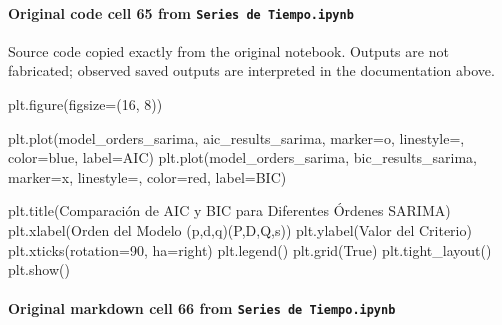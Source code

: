 \documentclass[
  11pt,
]{article}
\newenvironment{Shaded}{}{}
\newcommand{\DecValTok}[1]{\textcolor[rgb]{0.25,0.63,0.44}{#1}}
\newcommand{\NormalTok}[1]{#1}
\newcommand{\OperatorTok}[1]{\textcolor[rgb]{0.40,0.40,0.40}{#1}}
\newcommand{\StringTok}[1]{\textcolor[rgb]{0.25,0.44,0.63}{#1}}
\newcommand{\VariableTok}[1]{\textcolor[rgb]{0.10,0.09,0.49}{#1}}
\begin{document}
\paragraph{\texorpdfstring{Original code cell 65 from \texttt{Series\ de\ Tiempo.ipynb}}{Original code cell 65 from Series de Tiempo.ipynb}}\label{original-code-cell-65-from-series-de-tiempoipynb}

Source code copied exactly from the original notebook. Outputs are not fabricated; observed saved outputs are interpreted in the documentation above.

\begin{Shaded}
\begin{Highlighting}[]
\NormalTok{plt.figure(figsize}\OperatorTok{=}\NormalTok{(}\DecValTok{16}\NormalTok{, }\DecValTok{8}\NormalTok{))}

\NormalTok{plt.plot(model\_orders\_sarima, aic\_results\_sarima, marker}\OperatorTok{=}\StringTok{\textquotesingle{}o\textquotesingle{}}\NormalTok{, linestyle}\OperatorTok{=}\StringTok{\textquotesingle{}{-}\textquotesingle{}}\NormalTok{, color}\OperatorTok{=}\StringTok{\textquotesingle{}blue\textquotesingle{}}\NormalTok{, label}\OperatorTok{=}\StringTok{\textquotesingle{}AIC\textquotesingle{}}\NormalTok{)}
\NormalTok{plt.plot(model\_orders\_sarima, bic\_results\_sarima, marker}\OperatorTok{=}\StringTok{\textquotesingle{}x\textquotesingle{}}\NormalTok{, linestyle}\OperatorTok{=}\StringTok{\textquotesingle{}{-}{-}\textquotesingle{}}\NormalTok{, color}\OperatorTok{=}\StringTok{\textquotesingle{}red\textquotesingle{}}\NormalTok{, label}\OperatorTok{=}\StringTok{\textquotesingle{}BIC\textquotesingle{}}\NormalTok{)}

\NormalTok{plt.title(}\StringTok{\textquotesingle{}Comparación de AIC y BIC para Diferentes Órdenes SARIMA\textquotesingle{}}\NormalTok{)}
\NormalTok{plt.xlabel(}\StringTok{\textquotesingle{}Orden del Modelo (p,d,q)(P,D,Q,s)\textquotesingle{}}\NormalTok{)}
\NormalTok{plt.ylabel(}\StringTok{\textquotesingle{}Valor del Criterio\textquotesingle{}}\NormalTok{)}
\NormalTok{plt.xticks(rotation}\OperatorTok{=}\DecValTok{90}\NormalTok{, ha}\OperatorTok{=}\StringTok{\textquotesingle{}right\textquotesingle{}}\NormalTok{)}
\NormalTok{plt.legend()}
\NormalTok{plt.grid(}\VariableTok{True}\NormalTok{)}
\NormalTok{plt.tight\_layout()}
\NormalTok{plt.show()}
\end{Highlighting}
\end{Shaded}

\paragraph{\texorpdfstring{Original markdown cell 66 from \texttt{Series\ de\ Tiempo.ipynb}}{Original markdown cell 66 from Series de Tiempo.ipynb}}\label{original-markdown-cell-66-from-series-de-tiempoipynb}
\end{document}
